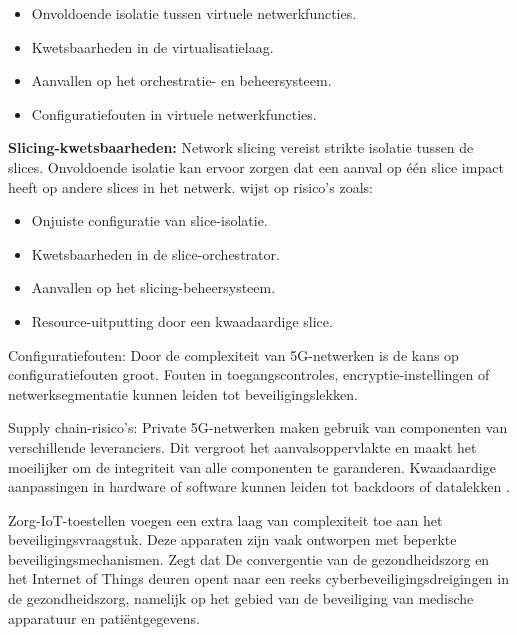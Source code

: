 \begin{itemize}
	\item Onvoldoende isolatie tussen virtuele netwerkfuncties.
	\item Kwetsbaarheden in de virtualisatielaag.
	\item Aanvallen op het orchestratie- en beheersysteem.
	\item Configuratiefouten in virtuele netwerkfuncties.
\end{itemize}
\vspace{0.5cm}

\textbf{Slicing-kwetsbaarheden:} Network slicing vereist strikte isolatie tussen de slices. Onvoldoende isolatie kan ervoor zorgen dat een aanval op één slice impact heeft op andere slices in het netwerk. \autocite{ENISA2022} wijst op risico's zoals:

\begin{itemize}
	\item Onjuiste configuratie van slice-isolatie.
	\item Kwetsbaarheden in de slice-orchestrator.
	\item Aanvallen op het slicing-beheersysteem.
	\item Resource-uitputting door een kwaadaardige slice.
\end{itemize}
\vspace{0.5cm}

Configuratiefouten: Door de complexiteit van 5G-netwerken is de kans op configuratiefouten groot. Fouten in toegangscontroles, encryptie-instellingen of netwerksegmentatie kunnen leiden tot beveiligingslekken.
\vspace{0.5cm}

Supply chain-risico's: Private 5G-netwerken maken gebruik van componenten van verschillende leveranciers. Dit vergroot het aanvalsoppervlakte en maakt het moeilijker om de integriteit van alle componenten te garanderen. Kwaadaardige aanpassingen in hardware of software kunnen leiden tot backdoors of datalekken \autocite{ENISA2022}.
\vspace{0.5cm}

Zorg-IoT-toestellen voegen een extra laag van complexiteit toe aan het beveiligingsvraagstuk. Deze apparaten zijn vaak ontworpen met beperkte beveiligingsmechanismen. \textcite{Exein2025} Zegt dat  De convergentie van de gezondheidszorg en het Internet of Things deuren opent naar een reeks cyberbeveiligingsdreigingen in de gezondheidszorg, namelijk op het gebied van de beveiliging van medische apparatuur en patiëntgegevens.
\vspace{0.5cm}

